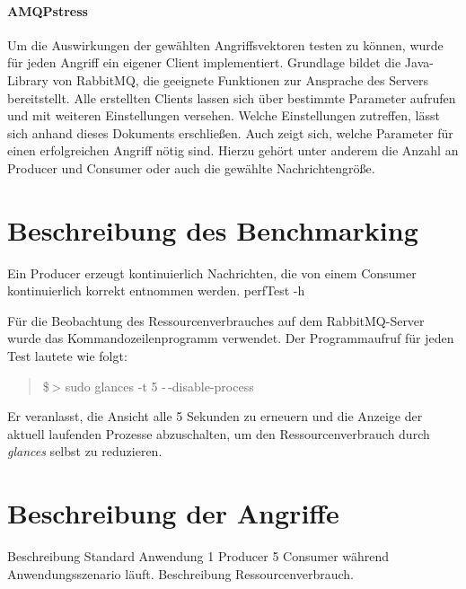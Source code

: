 \documentclass[	a4paper,
			11pt,
			titlepage,
			oneside,
			fleqn,
			listof=totoc,
			parskip,
			chapterprefix=false,
			numbers=noenddot]{scrartcl}
\begin{document}
	
	\paragraph{AMQPstress} Um die Auswirkungen der gewählten Angriffsvektoren testen zu können, wurde für jeden Angriff ein eigener Client implementiert. Grundlage bildet die Java-Library von RabbitMQ, die geeignete Funktionen zur Ansprache des Servers bereitstellt. Alle erstellten Clients lassen sich über bestimmte Parameter aufrufen und mit weiteren Einstellungen versehen. Welche Einstellungen zutreffen, lässt sich anhand dieses Dokuments erschließen. Auch zeigt sich, welche Parameter für einen erfolgreichen Angriff nötig sind. Hierzu gehört unter anderem die Anzahl an Producer und Consumer oder auch die gewählte Nachrichtengröße.
	
\clearpage
\section*{Beschreibung des Benchmarking}

		{Ein Producer erzeugt kontinuierlich Nachrichten, die von einem Consumer kontinuierlich korrekt entnommen werden.}%
		{perfTest -h}%
		{}

	Für die Beobachtung des Ressourcenverbrauches auf dem RabbitMQ-Server wurde das Kommandozeilenprogramm  verwendet. Der Programmaufruf für jeden Test lautete wie folgt:
	\begin{quote}
		\ttfamily
		\$\,> sudo glances -t 5 -\,-disable-process
	\end{quote}
	Er veranlasst, die Ansicht alle 5 Sekunden zu erneuern und die Anzeige der aktuell laufenden Prozesse abzuschalten, um den Ressourcenverbrauch durch \textsl{glances} selbst zu reduzieren.
	
\clearpage
\section*{Beschreibung der Angriffe}

	Beschreibung Standard Anwendung 1 Producer 5 Consumer während Anwendungsszenario läuft. Beschreibung Ressourcenverbrauch.
\end{document}
